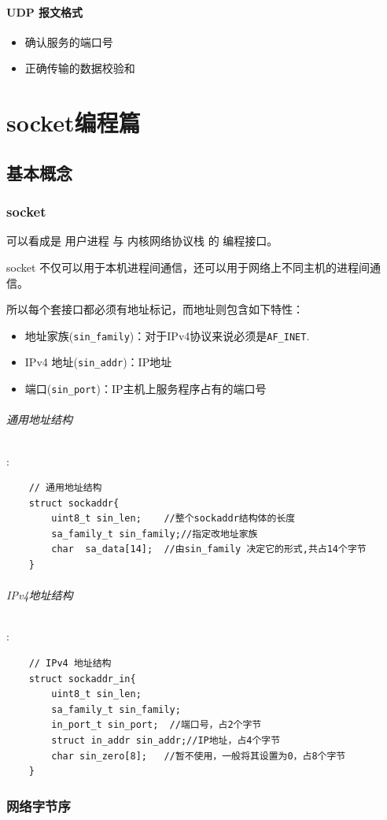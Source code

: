 \documentclass[UTF8,a4paper,8pt]{ctexbook}
\begin{document}
			\subsubsection{UDP 报文格式}
				\begin{itemize}
					\item 确认服务的端口号
					\item 正确传输的数据校验和
				\end{itemize}

\chapter{socket编程篇}
	\section{基本概念}
		\subsection{socket}可以看成是 用户进程 与 内核网络协议栈 的 编程接口。
		
			socket 不仅可以用于本机进程间通信，还可以用于网络上不同主机的进程间通信。
			
			所以每个套接口都必须有地址标记，而地址则包含如下特性：
			\begin{itemize}
				\item 地址家族(\verb|sin_family|)：对于IPv4协议来说必须是\verb|AF_INET|.
				\item IPv4 地址(\verb|sin_addr|)：IP地址
				\item 端口(\verb|sin_port|)：IP主机上服务程序占有的端口号
			\end{itemize}

		\subparagraph{通用地址结构}:
			\begin{lstlisting}
	// 通用地址结构
	struct sockaddr{
		uint8_t sin_len;	//整个sockaddr结构体的长度
		sa_family_t sin_family;//指定改地址家族
		char  sa_data[14];	//由sin_family 决定它的形式,共占14个字节
	}			
			\end{lstlisting}
		\subparagraph{IPv4地址结构}:
			\begin{lstlisting}
	// IPv4 地址结构
	struct sockaddr_in{
		uint8_t sin_len;
		sa_family_t sin_family;
		in_port_t sin_port;  //端口号，占2个字节 
		struct in_addr sin_addr;//IP地址，占4个字节
		char sin_zero[8];	//暂不使用，一般将其设置为0，占8个字节
	}			
			\end{lstlisting}
		\subsection{网络字节序}
\end{document}
